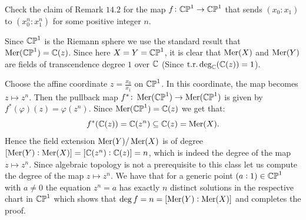 \documentclass[11pt, a4paper]{article}
\begin{document}
\begin{exercise}
  Check the claim of Remark $14.2$ for the map $f \colon \mathbb{CP}^1 \to \mathbb{CP}^1$
  that sends $(x_0 : x_1)$ to $(x_0^n : x_1^n)$ for some positive integer $n$.
\end{exercise}
\begin{solution}
  Since $\mathbb{CP}^1$ is the Riemann sphere we use the standard result
  that $\operatorname{Mer}(\mathbb{CP}^1) = \mathbb{C}(z)$.
  Since here $X = Y = \mathbb{CP}^1$,
  it is clear that $\operatorname{Mer}(X)$ and $\operatorname{Mer}(Y)$ are fields of transcendence
  degree $1$ over $\mathbb{C}$ (Since $\mathrm{t.r.}\deg_{\mathbb{C}}(\mathbb{C}(z)) = 1$).

  Choose the affine coordinate $z = \frac{x_0}{x_1}$ on $\mathbb{CP}^1$.
  In this coordinate, the map becomes $z \mapsto z^n$.
  Then the pullback map $f^* \colon \operatorname{Mer}(\mathbb{CP}^1) \to \operatorname{Mer}(\mathbb{CP}^1)$
  is given by $f^*(\varphi)(z) = \varphi(z^n)$.
  Since $\operatorname{Mer}(\mathbb{CP}^1) = \mathbb{C}(z)$ we get that:
  \[
    f^*(\mathbb{C}(z)) = \mathbb{C}(z^n) \subseteq \mathbb{C}(z) = \operatorname{Mer}(X).
  \]
  Hence the field extension $\operatorname{Mer}(Y)/\operatorname{Mer}(X)$ is
  of degree $[\operatorname{Mer}(Y) : \operatorname{Mer}(X)] = [\mathbb{C}(z^n) : \mathbb{C}(z)] = n$,
  which is indeed the degree of the map $z \mapsto z^n$.
  Since algebraic topology is not a prerequisite to this class let
  us compute the degree of the map $z \mapsto z^n$.
  We have that for a generic point $(a : 1) \in \mathbb{CP}^1$
  with $a \neq 0$ the equation $z^n = a$ has exactly $n$ distinct solutions
  in the respective chart in $\mathbb{CP}^1$ which shows that
  $\deg f = n = [\operatorname{Mer}(Y) : \operatorname{Mer}(X)]$ and completes the proof.
\end{solution}
\end{document}

